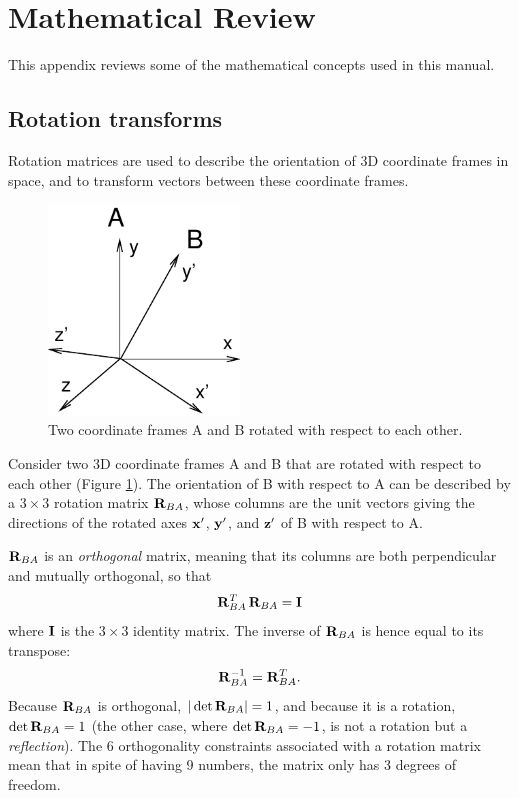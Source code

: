 
\appendix

\section{Mathematical Review}
\label{MathematicalReview:sec}

This appendix reviews some of the mathematical concepts used in this
manual.

\subsection{Rotation transforms}
\label{Rotations:sec}

Rotation matrices are used to describe the orientation of 3D
coordinate frames in space, and to transform vectors between these
coordinate frames.

\begin{figure}[t]
\begin{center}
\includegraphics[width=2in]{images/rotationAB}
\end{center}
\caption{Two coordinate frames A and B rotated with respect
to each other.}
\label{rotationAB:fig}
\end{figure}

Consider two 3D coordinate frames A and B that are rotated with
respect to each other (Figure \ref{rotationAB:fig}).  The orientation
of B with respect to A can be described by a $3 \times 3$ rotation
matrix ${\bf R}_{BA}$, whose columns are the unit vectors giving the
directions of the rotated axes ${\bf x}'$, ${\bf y}'$, and ${\bf z}'$ of B with
respect to A.

${\bf R}_{BA}$ is an {\it orthogonal} matrix, meaning that
its columns are both perpendicular and mutually
orthogonal, so that
%
\begin{equation}
{\bf R}_{BA}^T \, {\bf R}_{BA} = {\bf I}
\end{equation}
%
where ${\bf I}$ is the $3 \times 3$ identity matrix. The inverse
of ${\bf R}_{BA}$ is hence equal to its transpose:
%
\begin{equation}
{\bf R}_{BA}^{-1} = {\bf R}_{BA}^T.
\label{RABinv:eqn}
\end{equation}
%
Because ${\bf R}_{BA}$ is orthogonal, $|\det {\bf R}_{BA}| = 1$, and because it
is a rotation, $\det {\bf R}_{BA} = 1$ (the other case, where $\det {\bf R}_{BA}
= -1$, is not a rotation but a {\it reflection}).  The 6 orthogonality
constraints associated with a rotation matrix mean that in spite of
having 9 numbers, the matrix only has 3 degrees of freedom.

